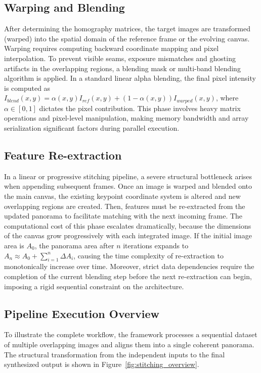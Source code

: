 \documentclass[10pt,twocolumn,letterpaper]{article}
\begin{document}
\subsection{Warping and Blending}
After determining the homography matrices, the target images are transformed (warped) into the spatial 
domain of the reference frame or the evolving canvas. 
Warping requires computing backward coordinate mapping and pixel interpolation. 
To prevent visible seams, exposure mismatches and ghosting artifacts in the overlapping regions, 
a blending mask or multi-band blending algorithm is applied. 
In a standard linear alpha blending, the final pixel intensity is computed as 
$I_{blend}(x,y) = \alpha(x,y) I_{ref}(x,y) + (1 - \alpha(x,y)) I_{warped}(x,y)$, where $\alpha \in [0,1]$ dictates the pixel contribution.
This phase involves heavy matrix operations and pixel-level manipulation, 
making memory bandwidth and array serialization significant factors during parallel execution.

\subsection{Feature Re-extraction}
In a linear or progressive stitching pipeline, a severe structural bottleneck arises 
when appending subsequent frames. Once an image is warped and blended onto the main canvas, 
the existing keypoint coordinate system is altered and new overlapping regions are created. 
Then, features must be re-extracted from the updated panorama to facilitate matching with the next incoming frame. 
The computational cost of this phase escalates dramatically, because the dimensions of the canvas grow progressively with each integrated image.
 If the initial image area is $A_0$, the panorama area after $n$ iterations expands to $A_n \approx A_0 + \sum_{i=1}^n \Delta A_i$,
 causing the time complexity of re-extraction to monotonically increase over time.
 Moreover, strict data dependencies require the completion of the current blending step before the next re-extraction can begin, imposing a rigid sequential constraint on the architecture.

\subsection{Pipeline Execution Overview}
To illustrate the complete workflow, the framework processes a sequential dataset of multiple overlapping images and aligns them into a single coherent panorama. 
The structural transformation from the independent inputs to the final synthesized output is shown in Figure~\ref{fig:stitching_overview}.
\end{document}
